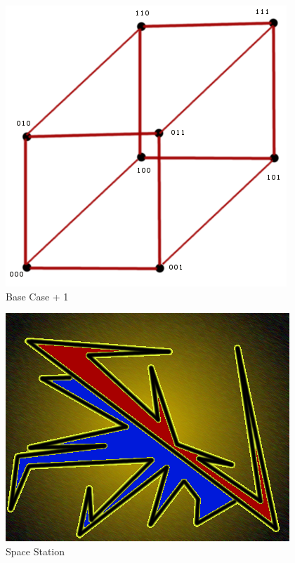 \documentclass[12pt]{article}
\begin{document}
\begin{figure}[p]
 \centering
 \includegraphics[scale=0.5]{fig7}
 \caption{Base Case + 1}
\end{figure}

\begin{figure}[p]
 \centering
 \includegraphics[scale=0.5]{stn}
 \caption{Space Station}
\end{figure}
\end{document}
